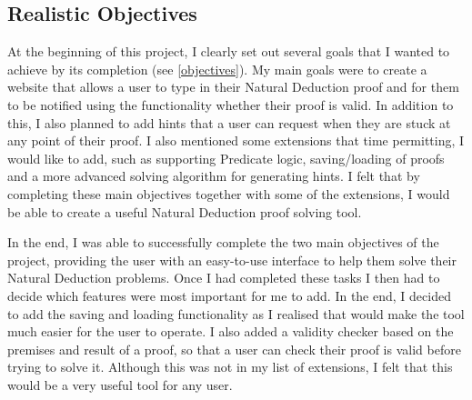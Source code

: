 \subsection{Realistic Objectives}

At the beginning of this project, I clearly set out several goals that I wanted to achieve by its completion (see \ref{objectives}). My main goals were to create a website that allows a user to type in their Natural Deduction proof and for them to be notified using the functionality whether their proof is valid. In addition to this, I also planned to add hints that a user can request when they are stuck at any point of their proof. I also mentioned some extensions that time permitting, I would like to add, such as supporting Predicate logic, saving/loading of proofs and a more advanced solving algorithm for generating hints. I felt that by completing these main objectives together with some of the extensions, I would be able to create a useful Natural Deduction proof solving tool.

In the end, I was able to successfully complete the two main objectives of the project, providing the user with an easy-to-use interface to help them solve their Natural Deduction problems. Once I had completed these tasks I then had to decide which features were most important for me to add. In the end, I decided to add the saving and loading functionality as I realised that would make the tool much easier for the user to operate. I also added a validity checker based on the premises and result of a proof, so that a user can check their proof is valid before trying to solve it. Although this was not in my list of extensions, I felt that this would be a very useful tool for any user. 

